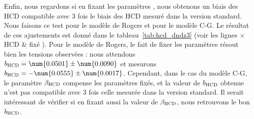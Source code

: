 Enfin, nous regardons si en fixant les paramètres \lya{}, nous obtenons un biais des HCD compatible avec 3 fois le biais des HCD mesuré dans la version standard. Nous faisons ce test pour le modèle de Rogers et pour le modèle C-G. Le résultat de ces ajustements est donné dans le tableau~\ref{tab:hcd_dndz3} (voir les lignes $\times$HCD \& \lya{} fixé \fg).
Pour le modèle de Rogers, le fait de fixer les paramètres \lya{} résout bien les tensions observées : nous attendons $b_{\textsc{HCD}} = \num{0.0501} \pm \num{0.0090}$ et mesurons $b_{\textsc{HCD}} = -\num{0.0555} \pm \num{0.0017}$.
  Cependant, dans le cas du modèle C-G, le paramètre $\beta_{\textsc{HCD}}$ compense les paramètres \lya{} fixés, et la valeur de $b_{\textsc{HCD}}$ obtenue n'est pas compatible avec 3 fois celle mesurée dans la version standard.
  Il serait intéressant de vérifier si en fixant aussi la valeur de $\beta_{\textsc{HCD}}$, nous retrouvons le bon $b_{\textsc{HCD}}$.


